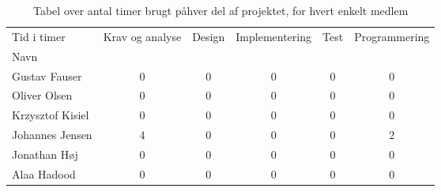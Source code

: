 \begin{table}[H]
\begin{tabular}{lccccc}
\hline
\multicolumn{1}{|l|}{Tid i timer} & Krav og analyse & \multicolumn{1}{l}{Design} & Implementering & Test & Programmering \\ \cline{2-6} 
\multicolumn{1}{|l|}{Navn} &  & \multicolumn{1}{l}{} &  &  &  \\ \cline{1-1}
Gustav Fauser & 0 & 0 & 0 & 0 &  0  \\
Oliver Olsen & 0 & 0 & 0 & 0 & 0 \\
Krzysztof Kisiel & 0 & 0 & 0 & 0 & 0  \\
Johannes Jensen & 4 & 0 & 0 & 0 & 2 \\
Jonathan H\o j & 0 & 0 & 0 & 0 & 0 \\
Alaa Hadood & 0 & 0 & 0 & 0 & 0 \\ \hline
\end{tabular}
\caption{Tabel over antal timer brugt p\aa \space hver del af projektet, for hvert enkelt medlem}
\label{table:timeplan}
\end{table}

